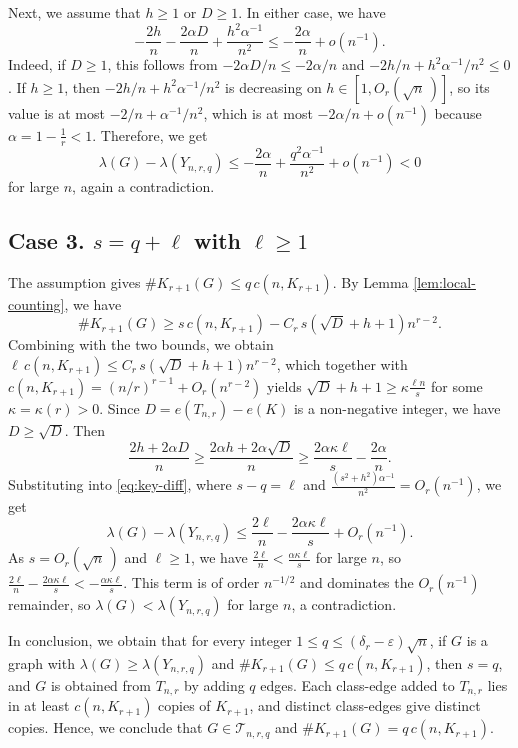 \documentclass[11pt,a4paper]{article}
\theoremstyle{definition}
\theoremstyle{plain}
\renewcommand{\le}{\leqslant}
\renewcommand{\ge}{\geqslant}
\begin{document}
Next, we assume that $h\ge1$ or $D\ge1$. In either case, we have 
\[
        -\frac{2h}{n}-\frac{2\alpha D}{n}+ \frac{h^2 \alpha^{-1}}{n^2}\le-\frac{2\alpha}{n}+o(n^{-1}).
\]
Indeed, if $D\ge1$, this follows from $-2\alpha D/n\le-2\alpha/n$ and $-2h/n+h^2 \alpha^{-1}/n^2\le0$. If $h\ge1$, then $-2h/n+h^2\alpha^{-1}/n^2$ is decreasing on $h\in [1,O_r(\sqrt n\, )]$, so its value is at most $-2/n+\alpha^{-1}/n^2$, which is at most $-2\alpha/n+o(n^{-1})$ because $\alpha = 1- \frac{1}{r} <1$. Therefore,  we get 
\[
        \lambda(G)-\lambda(Y_{n,r,q})\le-\frac{2\alpha}{n} 
        + \frac{q^2 \alpha^{-1}}{n^2}+o(n^{-1})
      <0
\]
for large $n$, again a contradiction.

\subsection*{Case 3. $s=q+\ell$ with $\ell\ge1$}
The assumption gives $\texttt{\#} K_{r+1}(G)\le q\,c(n,K_{r+1})$. 
By Lemma \ref{lem:local-counting}, we have 
\[
       \texttt{\#} K_{r+1}(G) \ge s\,c(n,K_{r+1})-C_r\,s(\sqrt D+h+1)n^{r-2}. 
\]
Combining with the two bounds,  we obtain $\ell\,c(n,K_{r+1})\le C_r\,s(\sqrt D+h+1)n^{r-2}$, which together with 
$c(n,K_{r+1})=(n/r)^{r-1}+O_r(n^{r-2})$ yields 
$ \sqrt D+h+1\ge \kappa \frac{\ell n}{s}$ for some $\kappa=\kappa(r)>0$.
Since $D=e(T_{n,r})-e(K)$ is a non-negative integer, we have $D \ge \sqrt{D} $. Then  
\[
        \frac{2h+2\alpha D}{n}\ge 
       \frac{ 2\alpha h+2\alpha\sqrt D}{n}  \ge  \frac{2\alpha \kappa \ell}{s} - \frac{2\alpha}{n}.   
\]
Substituting into \eqref{eq:key-diff}, where $s-q=\ell$ and
$\frac{(s^2+h^2)\alpha^{-1}}{n^2} =O_r(n^{-1})$, we get 
\[
        \lambda(G)-\lambda(Y_{n,r,q})
        \le \frac{2\ell}{n}- \frac{2\alpha \kappa \ell}{s}+O_r(n^{-1}).
\]
As $s=O_r(\sqrt n\,)$ and $\ell \ge 1$, we have $\frac{2\ell}{n} < \frac{\alpha\kappa \ell}{s}$ for large $n$, so
$\frac{2\ell}{n} - \frac{2\alpha\kappa\ell}{s} < - 
\frac{\alpha \kappa\ell}{s}$. This term is of order $n^{-1/2}$ and dominates the $O_r(n^{-1})$ remainder, so
$\lambda(G)<\lambda(Y_{n,r,q})$ for large $n$, a contradiction.

\medskip
In conclusion, we obtain that for every integer $1\le  q\le(\delta_r-\varepsilon)\sqrt n$, if $G$ is a graph with 
$\lambda(G)\ge\lambda(Y_{n,r,q})$ and 
 $\texttt{\#} K_{r+1}(G)\le q\,c(n,K_{r+1})$, then $s=q$, and $G$ is obtained from $T_{n,r}$ by adding $q$ edges. 
Each class-edge added to $T_{n,r}$ lies in at least $c(n,K_{r+1})$ copies of $K_{r+1}$, and distinct class-edges give distinct copies. 
Hence, we conclude that $G\in \mathcal{T}_{n,r,q}$ and $\texttt{\#} K_{r+1}(G) =  q\,c(n,K_{r+1})$. 
\end{document}

